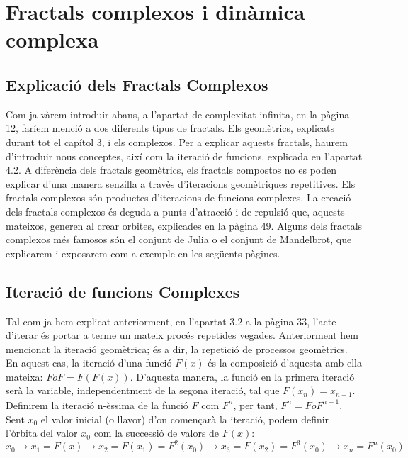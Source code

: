 \documentclass[12pt]{report}
\begin{document}
\chapter{Fractals complexos i dinàmica complexa}
\section{Explicació dels Fractals Complexos}
Com ja vàrem introduir abans, a l'apartat de complexitat infinita, en la pàgina 12, faríem menció a dos diferents tipus de fractals. Els geomètrics, explicats durant tot el capítol 3, i els complexos.
\newline
Per a explicar aquests fractals, haurem d'introduir nous conceptes, així com la iteració de funcions, explicada en l'apartat 4.2.
\newline
A diferència dels fractals geomètrics, els fractals compostos no es poden explicar d'una manera senzilla a travès d'iteracions geomètriques repetitives. Els fractals complexos són productes d'iteracions de funcions complexes.
\newline
La creació dels fractals complexos és deguda a punts d'atracció i de repulsió que, aquests mateixos, generen al crear orbites, explicades en la pàgina 49.
\newline
Alguns dels fractals complexos més famosos són el conjunt de Julia o el conjunt de Mandelbrot, que explicarem i exposarem com a exemple en les següents pàgines.

\section{Iteració de funcions Complexes}  
Tal com ja hem explicat anteriorment, en l'apartat 3.2 a la pàgina 33, l'acte d'iterar és portar a terme un mateix procés repetides vegades. Anteriorment hem mencionat la iteració geomètrica; és a dir, la repetició de processos geomètrics. En aquest cas, la iteració d'una funció $F(x)$ és la composició d'aquesta amb ella mateixa: $F o F = F(F(x))$. D'aquesta manera, la funció en la primera iteració serà la variable, independentment de la segona iteració, tal que $F(x_n) = x_{n+1}$. Definirem la iteració n-èssima de la funció $F$ com $F^n$, per tant, $F^n = F o F^{n-1}$.
\newline
Sent $x_0$ el valor inicial (o llavor) d'on començarà la iteració, podem definir l'òrbita del valor $x_0$ com la successió de valors de $F(x)$:
$$x_0 \rightarrow x_1 = F(x) \rightarrow x_2 = F(x_1) = F^2(x_0) \rightarrow x_3 = F(x_2) = F^3(x_0) \rightarrow x_n = F^n(x_0)$$
\end{document}
